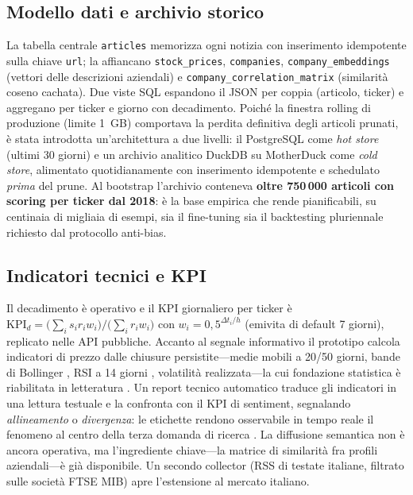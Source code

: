 \documentclass[a4paper,11pt]{article}
\begin{document}
\subsection{Modello dati e archivio storico}

La tabella centrale \texttt{articles} memorizza ogni notizia con inserimento idempotente sulla chiave \texttt{url}; la affiancano \texttt{stock\_prices}, \texttt{companies}, \texttt{company\_embeddings} (vettori delle descrizioni aziendali) e \texttt{company\_correlation\_matrix} (similarità coseno cachata). Due viste SQL espandono il JSON per coppia (articolo, ticker) e aggregano per ticker e giorno con decadimento. Poiché la finestra rolling di produzione (limite 1~GB) comportava la perdita definitiva degli articoli prunati, è stata introdotta un'architettura a due livelli: il PostgreSQL come \emph{hot store} (ultimi 30 giorni) e un archivio analitico DuckDB su MotherDuck come \emph{cold store}, alimentato quotidianamente con inserimento idempotente e schedulato \emph{prima} del prune. Al bootstrap l'archivio conteneva \textbf{oltre 750\,000 articoli con scoring per ticker dal 2018}: è la base empirica che rende pianificabili, su centinaia di migliaia di esempi, sia il fine-tuning sia il backtesting pluriennale richiesto dal protocollo anti-bias.

\subsection{Indicatori tecnici e KPI}

Il decadimento è operativo e il KPI giornaliero per ticker è $\text{KPI}_d=\big(\sum_i s_i r_i w_i\big)/\big(\sum_i r_i w_i\big)$ con $w_i=0{,}5^{\Delta t_i/h}$ (emivita di default 7 giorni), replicato nelle API pubbliche. Accanto al segnale informativo il prototipo calcola indicatori di prezzo dalle chiusure persistite---medie mobili a 20/50 giorni, bande di Bollinger \parencite{bollinger2001bollinger}, RSI a 14 giorni \parencite{wilder1978new}, volatilità realizzata---la cui fondazione statistica è riabilitata in letteratura \parencite{lo2000foundations, neely2014forecasting}. Un report tecnico automatico traduce gli indicatori in una lettura testuale e la confronta con il KPI di sentiment, segnalando \emph{allineamento} o \emph{divergenza}: le etichette rendono osservabile in tempo reale il fenomeno al centro della terza domanda di ricerca \parencite{brock1992simple}. La diffusione semantica non è ancora operativa, ma l'ingrediente chiave---la matrice di similarità fra profili aziendali---è già disponibile. Un secondo collector (RSS di testate italiane, filtrato sulle società FTSE MIB) apre l'estensione al mercato italiano.
\end{document}
